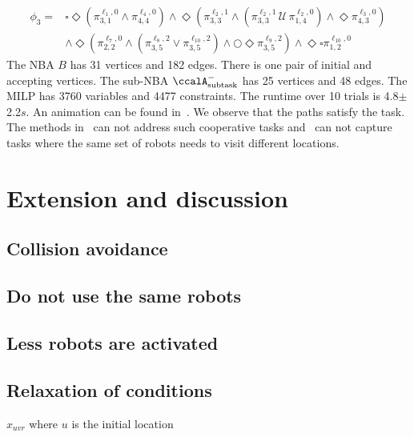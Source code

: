 \documentclass[Afour,sageh,times]{sagej}
\newcommand{\auto}[1]{\ccalA_{\textup{#1}}}
\newcommand{\aap}[4]{\mathcal{\pi}_{{#1},{#2}}^{#3,#4}}
\begin{document}
{{\small
\begingroup
\begin{align*}
  \phi_3 = &  \square \Diamond (\pi^{\ell_1,0}_{3,1} \wedge \pi^{\ell_4, 0}_{4,4}) \wedge \Diamond ( \pi^{\ell_2,1}_{3,3} \wedge  (\pi^{\ell_2,1}_{3,3} \,\mathcal{U} \, \pi^{\ell_2,0}_{1,4})  \wedge \Diamond \pi_{4,3}^{\ell_3,0})   \nonumber \\ & \wedge \Diamond (\aap{2}{2}{\ell_7}{0} \wedge (\aap{3}{5}{\ell_8}{2} \vee \aap{3}{5}{\ell_{10}}{2}) \wedge \bigcirc  \Diamond  \aap{3}{5}{\ell_{9}}{2} ) \wedge \Diamond \square \aap{1}{2}{\ell_{10}}{0}
\end{align*}
\endgroup
\normalsize
The NBA $B$ has 31 vertices and 182 edges. There is one pair of initial and accepting vertices. The sub-NBA $\auto{subtask}^-$ has 25 vertices and 48 edges. The MILP has 3760 variables and 4477 constraints. The runtime over 10 trials is 4.8$\pm$2.2$s$. {An animation can be found in~\cite{ltlmrta}.} We observe that the paths satisfy the task. The methods in~\cite{schillinger2018decomposition,schillinger2018simultaneous,faruq2018simultaneous} can not address such cooperative tasks and~\cite{sahin2017provably,sahin2017synchronous,sahin2019multi,sahin2019multirobot} can not capture tasks where the same set of robots needs to visit different locations.


\section{Extension and discussion}
\subsection{Collision avoidance}
\subsection{Do not use the same robots}
\subsection{Less robots are activated}
\subsection{Relaxation of conditions}
$x_{uvr}$ where $u$ is the initial location

}}
\end{document}
